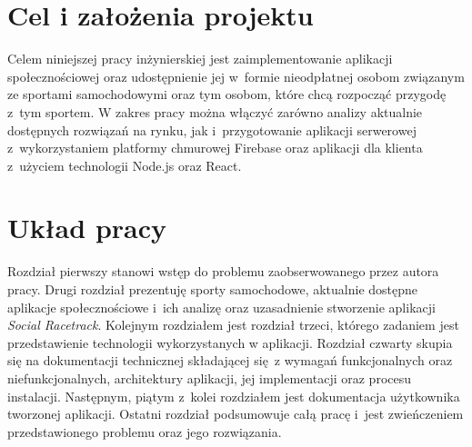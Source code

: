 \documentclass[../Kamil_Kowalewski_Main.tex]{subfiles}
\begin{document}
{    \section{Cel i założenia projektu}
    \label{chapter1:wprowadzenie_sporty:cel} {
        Celem niniejszej pracy inżynierskiej jest zaimplementowanie aplikacji
        społecznościowej oraz udostępnienie jej w~formie nieodpłatnej osobom związanym
        ze sportami samochodowymi oraz tym osobom, które chcą rozpocząć przygodę z~tym
        sportem. W zakres pracy można włączyć zarówno analizy aktualnie dostępnych
        rozwiązań na rynku, jak i~przygotowanie aplikacji serwerowej z~wykorzystaniem
        platformy chmurowej Firebase oraz aplikacji dla klienta z~użyciem technologii
        Node.js oraz React.
    }

    \section{Układ pracy}
    \label{chapter1:wprowadzenie_sporty:uklad} {
        Rozdział pierwszy stanowi wstęp do problemu zaobserwowanego przez autora pracy.
        Drugi rozdział prezentuję sporty samochodowe, aktualnie dostępne aplikacje
        społecznościowe i~ich analizę oraz uzasadnienie stworzenie aplikacji
        \textit{Social Racetrack}. Kolejnym rozdziałem jest rozdział trzeci,
        którego zadaniem jest przedstawienie technologii wykorzystanych w aplikacji.
        Rozdział czwarty skupia się na dokumentacji technicznej składającej się~z
        wymagań funkcjonalnych oraz niefunkcjonalnych, architektury aplikacji, jej
        implementacji oraz procesu instalacji. Następnym, piątym z~kolei rozdziałem
        jest dokumentacja użytkownika tworzonej aplikacji. Ostatni rozdział
        podsumowuje całą pracę i~jest zwieńczeniem przedstawionego problemu oraz jego
        rozwiązania.
    }

}
\end{document}
